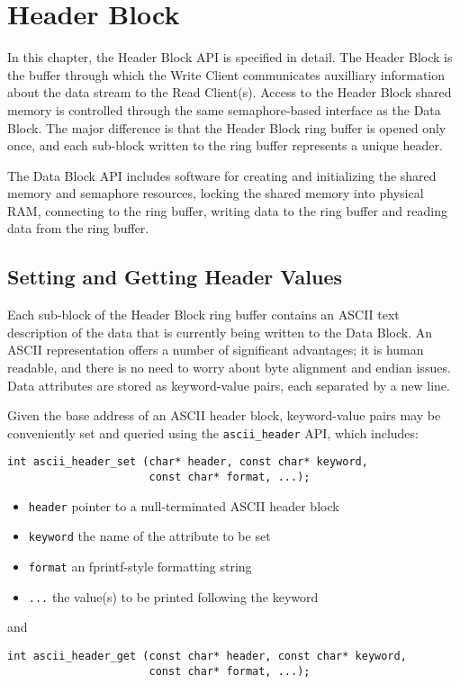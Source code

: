 \chapter{Header Block}

In this chapter, the Header Block API is specified in detail.  The
Header Block is the buffer through which the Write Client communicates
auxilliary information about the data stream to the Read Client(s).
Access to the Header Block shared memory is controlled through the
same semaphore-based interface as the Data Block.  The major difference
is that the Header Block ring buffer is opened only once, and each
sub-block written to the ring buffer represents a unique header.

The Data Block API includes software for creating and initializing the
shared memory and semaphore resources, locking the shared memory into
physical RAM, connecting to the ring buffer, writing data to the ring
buffer and reading data from the ring buffer.

\section{Setting and Getting Header Values}

Each sub-block of the Header Block ring buffer contains an ASCII text
description of the data that is currently being written to the Data
Block.  An ASCII representation offers a number of significant
advantages; it is human readable, and there is no need to worry about
byte alignment and endian issues.  Data attributes are stored as
keyword-value pairs, each separated by a new line.

Given the base address of an ASCII header block, keyword-value pairs
may be conveniently set and queried using the {\tt ascii\_header} API,
which includes:
\begin{verbatim}
int ascii_header_set (char* header, const char* keyword,
                      const char* format, ...);
\end{verbatim}

\begin{itemize}
\item {\tt header} pointer to a null-terminated ASCII header block

\item {\tt keyword} the name of the attribute to be set

\item {\tt format} an fprintf-style formatting string

\item {\tt ...} the value(s) to be printed following the keyword
\end{itemize}
and
\begin{verbatim}
int ascii_header_get (const char* header, const char* keyword,
                      const char* format, ...);
\end{verbatim}

